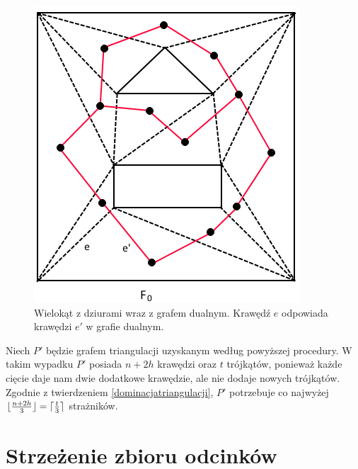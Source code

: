 \documentclass[brudnopis]{xmgr}
\DeclarePairedDelimiter\ceil{\lceil}{\rceil}
\DeclarePairedDelimiter\floor{\lfloor}{\rfloor}
\theoremstyle{definition}
\begin{document}
\begin{figure}[h!]
  \centering
    \includegraphics{rysunki/triangulacja_dziury.png}
    \caption{Wielokąt z dziurami wraz z grafem dualnym. Krawędź $e$ odpowiada krawędzi $e'$ w grafie dualnym.}
    \label{fig:triangulacja}
    \vspace{4in}
\end{figure} 

\indent Niech $P'$ będzie grafem triangulacji uzyskanym według powyższej procedury. W takim wypadku $P'$ posiada $n + 2h$ krawędzi oraz $t$ trójkątów, ponieważ każde cięcie daje nam dwie dodatkowe krawędzie, ale nie dodaje nowych trójkątów. Zgodnie z twierdzeniem \ref{dominacjatriangulacji}, $P'$ potrzebuje co najwyżej $\floor{\frac{n+2h}{3}} = \ceil{\frac{t}{3}}$ strażników.

\chapter{Strzeżenie zbioru odcinków}
\end{document}
